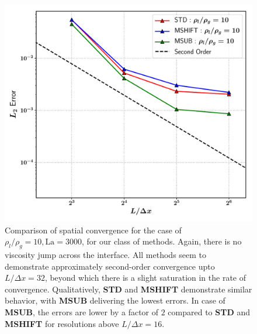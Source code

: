 \begin{figure}[h!]
    \centering
    \includegraphics[width = 1.0\textwidth]{plots/capwave/conv_r10.pdf}
	\caption{Comparison of spatial convergence for the case of $\rho_l/\rho_g = 10 , \textrm{La} = 3000$, for our class of methods. Again, there is no viscosity jump across the interface. All methods seem to demonstrate approximately second-order convergence upto $ L/ \Delta x = 32 $, beyond which there is a slight saturation in the rate of convergence. Qualitatively, \textbf{STD} and \textbf{MSHIFT} demonstrate similar behavior, with \textbf{MSUB} delivering the lowest errors. In case of \textbf{MSUB}, the errors are lower by a factor of $2$ compared to \textbf{STD} and \textbf{MSHIFT} for resolutions above $L / \Delta x = 16$. }
    \label{conv_r10}
\end{figure}


